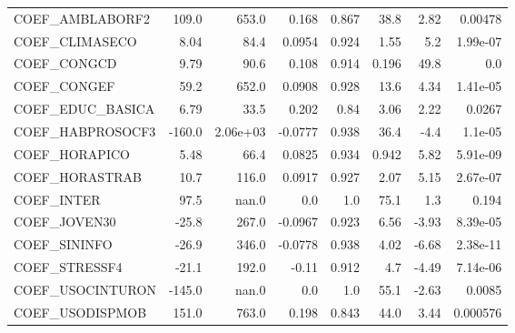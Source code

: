 \begin{tabular}{lrrrrrrr}
COEF\_AMBLABORF2  &  109.0 &    653.0 &   0.168 &    0.867 &          38.8 &         2.82 &       0.00478 \\
COEF\_CLIMASECO   &   8.04 &     84.4 &  0.0954 &    0.924 &          1.55 &          5.2 &      1.99e-07 \\
COEF\_CONGCD      &   9.79 &     90.6 &   0.108 &    0.914 &         0.196 &         49.8 &           0.0 \\
COEF\_CONGEF      &   59.2 &    652.0 &  0.0908 &    0.928 &          13.6 &         4.34 &      1.41e-05 \\
COEF\_EDUC\_BASICA &   6.79 &     33.5 &   0.202 &     0.84 &          3.06 &         2.22 &        0.0267 \\
COEF\_HABPROSOCF3 & -160.0 & 2.06e+03 & -0.0777 &    0.938 &          36.4 &         -4.4 &       1.1e-05 \\
COEF\_HORAPICO    &   5.48 &     66.4 &  0.0825 &    0.934 &         0.942 &         5.82 &      5.91e-09 \\
COEF\_HORASTRAB   &   10.7 &    116.0 &  0.0917 &    0.927 &          2.07 &         5.15 &      2.67e-07 \\
COEF\_INTER       &   97.5 &    nan.0 &     0.0 &      1.0 &          75.1 &          1.3 &         0.194 \\
COEF\_JOVEN30     &  -25.8 &    267.0 & -0.0967 &    0.923 &          6.56 &        -3.93 &      8.39e-05 \\
COEF\_SININFO     &  -26.9 &    346.0 & -0.0778 &    0.938 &          4.02 &        -6.68 &      2.38e-11 \\
COEF\_STRESSF4    &  -21.1 &    192.0 &   -0.11 &    0.912 &           4.7 &        -4.49 &      7.14e-06 \\
COEF\_USOCINTURON & -145.0 &    nan.0 &     0.0 &      1.0 &          55.1 &        -2.63 &        0.0085 \\
COEF\_USODISPMOB  &  151.0 &    763.0 &   0.198 &    0.843 &          44.0 &         3.44 &      0.000576 \\
\bottomrule
\end{tabular}

